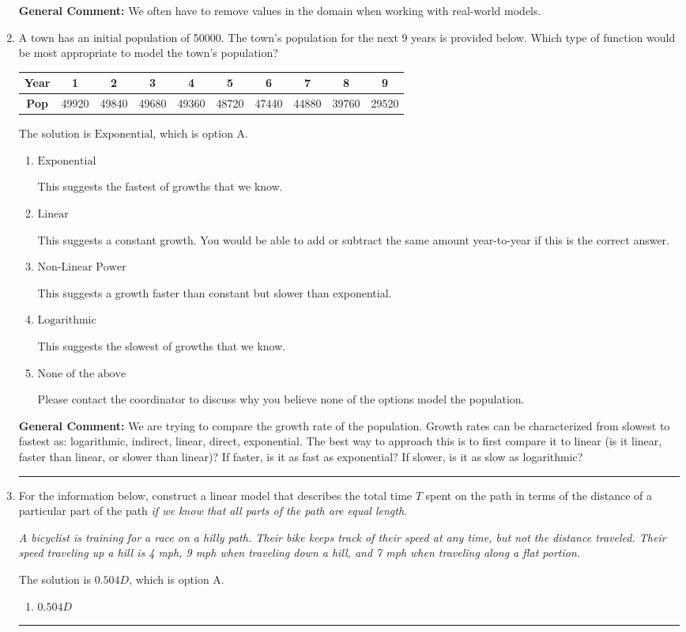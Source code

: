 \documentclass{extbook}[14pt]
\newcommand{\litem}[1]{\item #1

\rule{\textwidth}{0.4pt}}
\begin{document}
\begin{enumerate}
{\textbf{General Comment:} We often have to remove values in the domain when working with real-world models.
}
\litem{
A town has an initial population of 50000. The town's population for the next 9 years is provided below. Which type of function would be most appropriate to model the town's population?


\begin{tabular}{c|c|c|c|c|c|c|c|c|c}
\textbf{Year} &1 &2 &3 &4 &5 &6 &7 &8 &9\tabularnewline \hline
\textbf{Pop} &49920 &49840 &49680 &49360 &48720 &47440 &44880 &39760 &29520\end{tabular}The solution is \( \text{Exponential} \), which is option A.\begin{enumerate}[label=\Alph*.]
\item \( \text{Exponential} \)

This suggests the fastest of growths that we know.
\item \( \text{Linear} \)

This suggests a constant growth. You would be able to add or subtract the same amount year-to-year if this is the correct answer.
\item \( \text{Non-Linear Power} \)

This suggests a growth faster than constant but slower than exponential.
\item \( \text{Logarithmic} \)

This suggests the slowest of growths that we know.
\item \( \text{None of the above} \)

Please contact the coordinator to discuss why you believe none of the options model the population.
\end{enumerate}

\textbf{General Comment:} We are trying to compare the growth rate of the population. Growth rates can be characterized from slowest to fastest as: logarithmic, indirect, linear, direct, exponential. The best way to approach this is to first compare it to linear (is it linear, faster than linear, or slower than linear)? If faster, is it as fast as exponential? If slower, is it as slow as logarithmic?
}
\litem{
For the information below, construct a linear model that describes the total time $T$ spent on the path in terms of the distance of a particular part of the path \textit{if we know that all parts of the path are equal length}.

\begin{center}
    \textit{ A bicyclist is training for a race on a hilly path. Their bike keeps track of their speed at any time, but not the distance traveled. Their speed traveling up a hill is 4 mph, 9 mph when traveling down a hill, and 7 mph when traveling along a flat portion. }
\end{center}
The solution is \( 0.504 D \), which is option A.\begin{enumerate}[label=\Alph*.]
\item \( 0.504 D \)


\end{enumerate}}
\end{enumerate}
\end{document}
